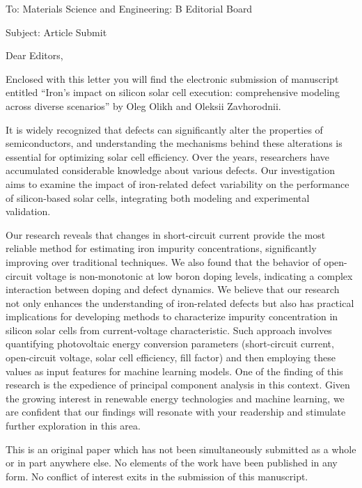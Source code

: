 \documentclass[preprint]{elsarticle}
\begin{document}
To:
Materials Science and Engineering: B Editorial Board


Subject:
Article Submit

\vspace{5mm}
Dear Editors,

\vspace{3mm}
Enclosed with this letter you will find the electronic submission of manuscript entitled
``Iron's impact on silicon solar cell execution: comprehensive modeling across diverse scenarios''
by Oleg Olikh and Oleksii Zavhorodnii.

It is widely recognized that defects can significantly alter the properties of semiconductors,
and understanding the mechanisms behind these alterations is essential for optimizing solar cell efficiency.
Over the years, researchers have accumulated considerable knowledge about various defects.
Our investigation aims to examine the impact of iron-related defect variability
on the performance of silicon-based solar cells, integrating both modeling and experimental validation.

Our research reveals that changes in short-circuit current provide the most reliable method for estimating iron impurity concentrations,
significantly improving over traditional techniques.
We also found that the behavior of open-circuit voltage is non-monotonic at low boron doping levels,
indicating a complex interaction between doping and defect dynamics.
We believe that our research not only enhances the understanding of iron-related defects
but also has practical implications for developing methods to characterize impurity concentration in
silicon solar cells from current-voltage characteristic.
Such approach involves quantifying photovoltaic energy conversion parameters
(short-circuit current, open-circuit voltage, solar cell efficiency, fill factor)
and then employing these values as input features for machine learning models.
One of the finding of this research is the expedience of principal component analysis in this context.
Given the growing interest in renewable energy technologies and machine learning,
we are confident that our findings will resonate with your readership and stimulate further exploration in this area.


This is an original paper which has not been simultaneously submitted as a whole or in part anywhere else.
No elements of the work have been published in any form.
No conflict of interest exits in the submission of this manuscript.
\end{document}
